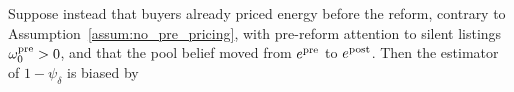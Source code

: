 Suppose instead that buyers already priced energy before the reform, contrary to Assumption~\ref{assum:no_pre_pricing}, with pre-reform attention to silent listings $\omega_0^{\rm pre}>0$, and that the pool belief moved from $e^{\rm pre}$ to $e^{\rm post}$. Then the estimator of $1-\psi_\delta$ is biased by
